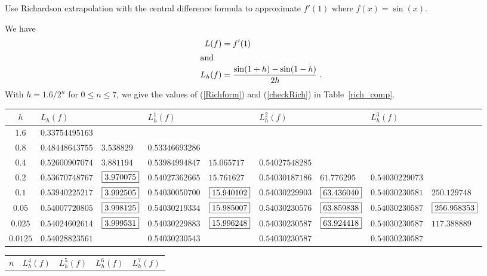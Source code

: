 \begin{egg}
Use Richardson extrapolation with the central difference formula to
approximate $f'(1)$ where $f(x) = \sin(x)$.

We have
\begin{align*}
L(f) &= f'(1) \\
\intertext{and}
L_h(f) &= \frac{\sin(1+h) - \sin(1-h)}{2h} \; .
\end{align*}
With $h=1.6/2^n$ for $0 \leq n \leq 7$, we give the values of
(\ref{Richform}) and (\ref{checkRich}) in Table~\ref{rich_comp}.

\begin{table}
\footnotesize
\begin{sideways}
\begin{tabular}{c|llllllll}
$h$ & \multicolumn{2}{l}{$L_h(f)$} & \multicolumn{2}{l}{$L_h^1(f)$} &
\multicolumn{2}{l}{$L_h^2(f)$} & \multicolumn{2}{l}{$L_h^3(f)$} \\
\hline
$1.6$ & $0.33754495163$ & && && && \\
$0.8$ & $0.48448643755$ & $3.538829$ & $0.53346693286$ & && && \\
$0.4$ & $0.52600907074$ & $3.881194$ & $0.53984994847$ &
$15.065717$ & $0.54027548285$ & && \\
$0.2$ & $0.53670748767$ & $\fbox{3.970075}$ & $0.54027362665$ &
$15.761627$ & $0.54030187186$ & $61.776295$ & $0.54030229073$ & \\
$0.1$ & $0.53940225217$ & $\fbox{3.992505}$ & $0.54030050700$ &
$\fbox{15.940102}$ & $0.54030229903$ & $\fbox{63.436040}$ &
$0.54030230581$ & $250.129748$ \\
$0.05$ & $0.54007720805$ & $\fbox{3.998125}$ & $0.54030219334$ &
$\fbox{15.985007}$ & $0.54030230576$ & $\fbox{63.859838}$ &
$0.54030230587$ & $\fbox{256.958353}$  \\
$0.025$ & $0.54024602614$ & $\fbox{3.999531}$ & $0.54030229883$ &
$\fbox{15.996248}$ & $0.54030230587$ & $\fbox{63.924418}$ &
$0.54030230587$ & $117.388889$ \\
$0.0125$ & $0.54028823561$ & & $0.54030230543$ & & $0.54030230587$ & &
$0.54030230587$ &
\end{tabular}
\end{sideways}
\hspace*{5em}
\begin{sideways}
\begin{tabular}{c|llllllll}
$n$ & \multicolumn{2}{l}{$L_h^4(f)$} & \multicolumn{2}{l}{$L_h^5(f)$} &
\multicolumn{2}{l}{$L_h^6(f)$} & \multicolumn{2}{l}{$L_h^7(f)$} \\

\end{tabular}
\end{sideways}
\end{table}
\end{egg}
